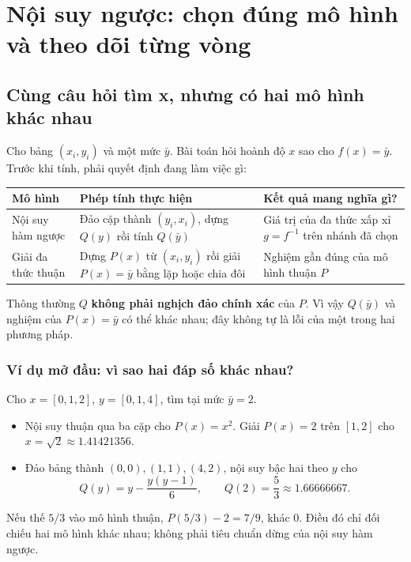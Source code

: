 \chapter{Nội suy ngược: chọn đúng mô hình và theo dõi từng vòng}
\label{ch:inverse}


\section{Cùng câu hỏi tìm x, nhưng có hai mô hình khác nhau}
Cho bảng $(x_i,y_i)$ và một mức $\bar y$. Bài toán hỏi hoành độ $x$ sao cho $f(x)=\bar y$. Trước khi tính, phải quyết định đang làm việc gì:
\begin{center}\small
\begin{tabular}{@{}p{.24\linewidth}p{.34\linewidth}p{.31\linewidth}@{}}\toprule
Mô hình & Phép tính thực hiện & Kết quả mang nghĩa gì?\\\midrule
Nội suy hàm ngược & Đảo cặp thành $(y_i,x_i)$, dựng $Q(y)$ rồi tính $Q(\bar y)$ & Giá trị của đa thức xấp xỉ $g=f^{-1}$ trên nhánh đã chọn\\
Giải đa thức thuận & Dựng $P(x)$ từ $(x_i,y_i)$ rồi giải $P(x)=\bar y$ bằng lặp hoặc chia đôi & Nghiệm gần đúng của mô hình thuận $P$\\\bottomrule
\end{tabular}\end{center}

Thông thường $Q$ \textbf{không phải nghịch đảo chính xác} của $P$. Vì vậy $Q(\bar y)$ và nghiệm của $P(x)=\bar y$ có thể khác nhau; đây không tự là lỗi của một trong hai phương pháp.

\subsection{Ví dụ mở đầu: vì sao hai đáp số khác nhau?}
Cho $x=[0,1,2]$, $y=[0,1,4]$, tìm tại mức $\bar y=2$.
\begin{itemize}
\item Nội suy thuận qua ba cặp cho $P(x)=x^2$. Giải $P(x)=2$ trên $[1,2]$ cho $x=\sqrt2\approx1.41421356$.
\item Đảo bảng thành $(0,0),(1,1),(4,2)$, nội suy bậc hai theo $y$ cho
\[
 Q(y)=y-\frac{y(y-1)}6,\qquad Q(2)=\frac53\approx1.66666667.
\]
\end{itemize}
Nếu thế $5/3$ vào mô hình thuận, $P(5/3)-2=7/9$, khác 0. Điều đó chỉ đối chiếu hai mô hình khác nhau; không phải tiêu chuẩn dừng của nội suy hàm ngược.

